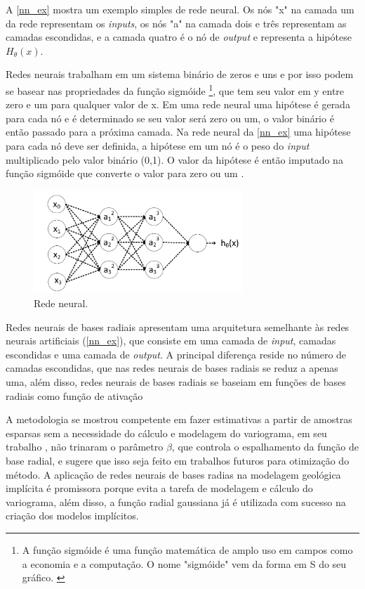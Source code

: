 A \autoref{nn_ex} mostra um exemplo simples de rede neural. Os nós "x" na camada um da rede representam os \textit{inputs}, os nós "a" na camada dois e três representam as camadas escondidas, e a camada quatro é o nó de \textit{output} e representa a hipótese $H_\theta(x)$.

Redes neurais trabalham em um sistema binário de zeros e uns e por isso podem se basear nas propriedades da função sigmóide \footnote{A função sigmóide é uma função matemática de amplo uso em campos como a economia e a computação. O nome "sigmóide" vem da forma em S do seu gráfico. \cite{wiki:sigmoid}}, que tem seu valor em y entre zero e um para qualquer valor de x. Em uma rede neural uma hipótese é gerada para cada nó e é determinado se seu valor será zero ou um, o valor binário é então passado para a próxima camada. Na rede neural da \autoref{nn_ex} uma hipótese para cada nó deve ser definida, a hipótese em um nó é o peso do \textit{input} multiplicado pelo valor binário (0,1). O valor da hipótese é então imputado na função sigmóide que converte o valor para zero ou um \cite{samson_intro_ml}.

\begin{figure}[!ht]
	\caption{\label{nn_ex}Rede neural.}
	\begin{center}
		\includegraphics[width=0.7\textwidth]{capitulo_3/NN_ex.png}
	\end{center}
\end{figure}

Redes neurais de bases radiais apresentam uma arquitetura semelhante às redes neurais artificiais (\autoref{nn_ex}), que consiste em uma camada de \textit{input}, camadas escondidas e uma camada de \textit{output}. A principal diferença reside no número de camadas escondidas, que nas redes neurais de bases radiais se reduz a apenas uma, além disso, redes neurais de bases radiais se baseiam em funções de bases radiais como função de ativação 

A metodologia se mostrou competente em fazer estimativas a partir de amostras esparsas sem a necessidade do cálculo e modelagem do variograma, em seu trabalho , não trinaram o parâmetro $\beta$, que controla o espalhamento da função de base radial, e sugere que isso seja feito em trabalhos futuros para otimização do método. A aplicação de redes neurais de bases radias na modelagem geológica implícita é promissora porque evita a tarefa de modelagem e cálculo do variograma, além disso, a função radial gaussiana já é utilizada com sucesso na criação dos modelos implícitos. 

